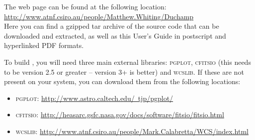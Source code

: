 %
%
%
%
\label{app-install}

The \duchamp web page can be found at the following location:\\
\href{http://www.atnf.csiro.au/people/Matthew.Whiting/Duchamp}%
{http://www.atnf.csiro.au/people/Matthew.Whiting/Duchamp}\\
Here you can find a gzipped tar archive of the source code that can be
downloaded and extracted, as well as this User's Guide in postscript
and hyperlinked PDF formats.

To build \duchamp, you will need three main external libraries:
\textsc{pgplot}, \textsc{cfitsio} (this needs to be version 2.5 or
greater -- version 3+ is better) and \textsc{wcslib}. If these are not
present on your system, you can download them from the following
locations:
\begin{itemize}
\item \textsc{pgplot}:
\href{http://www.astro.caltech.edu/~tjp/pgplot/}%
{\footnotesize http://www.astro.caltech.edu/~tjp/pgplot/}
\item \textsc{cfitsio}:
\href{http://heasarc.gsfc.nasa.gov/docs/software/fitsio/fitsio.html}%
{\footnotesize http://heasarc.gsfc.nasa.gov/docs/software/fitsio/fitsio.html}
\item \textsc{wcslib}:
\href{http://www.atnf.csiro.au/people/Mark.Calabretta/WCS/index.html}%
{\footnotesize http://www.atnf.csiro.au/people/Mark.Calabretta/WCS/index.html}
\end{itemize}

